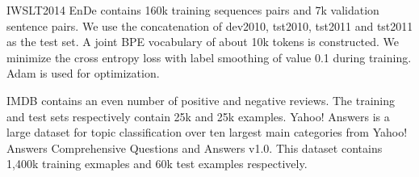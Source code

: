 \documentclass[11pt,a4paper]{article}
\begin{document}
IWSLT2014 EnDe contains 160k training sequences pairs and 7k validation sentence pairs. We use the concatenation of dev2010, tst2010, tst2011 and tst2011 as the test set. A joint BPE vocabulary of about 10k tokens is constructed.  
We minimize the cross entropy loss with label smoothing of value 0.1 during training.  Adam \citep{kingma2014adam} is used for optimization.

IMDB contains an even number of positive and negative reviews. The training and test sets  respectively contain 25k and 25k examples.
Yahoo! Answers is a large dataset for topic classification over ten largest main categories from Yahoo! Answers Comprehensive Questions and Answers v1.0. This dataset contains 1,400k training exmaples and 60k test examples respectively.
\end{document}
